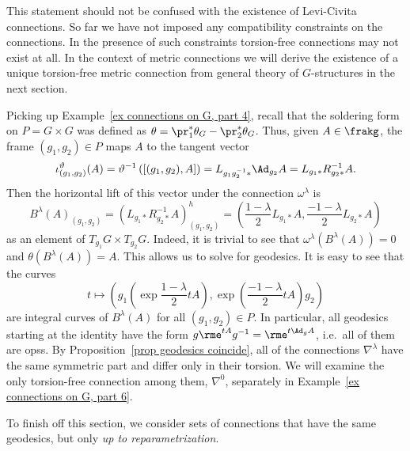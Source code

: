 \begin{rem}
    This statement should not be confused with the existence of Levi-Civita connections. So far we have not imposed any compatibility constraints on the connections. In the presence of such constraints torsion-free connections may not exist at all. In the context of metric connections we will derive the existence of a unique torsion-free metric connection from general theory of $G$-structures in the next section.
\end{rem}



\begin{example}\label{ex connections on G, part 5}
    Picking up Example~\ref{ex connections on G, part 4}, recall that the soldering form on $P=G\times G$ was defined as $\theta=\pr_1^\ast\theta_G-\pr_2^\ast\theta_G$. Thus, given $A\in\frakg$, the frame $(g_1,g_2)\in P$ maps $A$ to the tangent vector 
    \[\iota_{(g_1,g_2)}^\vartheta(A)=\vartheta^{-1}\left([(g_1,g_2),A]\right)=L_{g_1g_2^{-1}\ast}\Ad_{g_2}A=L_{g_1\ast}R_{g_2\ast}^{-1}A.\]
    Then the horizontal lift of this vector under the connection $\omega^\lambda$ is 
    \[B^\lambda(A)_{(g_1,g_2)}=(L_{g_1\ast}R_{g_2\ast}^{-1}A)_{(g_1,g_2)}^h=\left(\frac{1-\lambda}{2}L_{g_1\ast}A, \frac{-1-\lambda}{2}L_{g_2\ast}A\right)\]
    as an element of $T_{g_1}G\times T_{g_2}G$. Indeed, it is trivial to see that $\omega^\lambda(B^\lambda(A))=0$ and $\theta(B^\lambda(A))=A$. 
    This allows us to solve for geodesics. It is easy to see that the curves 
    \[t\mapsto \left(g_1\left(\exp\frac{1-\lambda}{2}tA\right),\exp\left(\frac{-1-\lambda}{2}tA\right)g_2\right)\] 
    are integral curves of $B^\lambda(A)$ for all $(g_1,g_2)\in P$. In particular, all geodesics starting at the identity have the form $g\rme^{tA}g^{-1}=\rme^{t\Ad_g A}$, i.e.\ all of them are \glspl{ops}. By Proposition~\ref{prop geodesics coincide}, all of the connections $\nabla^\lambda$ have the same symmetric part and differ only in their torsion. We will examine the only torsion-free connection among them, $\nabla^0$, separately in Example~\ref{ex connections on G, part 6}.
\end{example}



To finish off this section, we consider sets of connections that have the same geodesics, but only \emph{up to reparametrization}.


